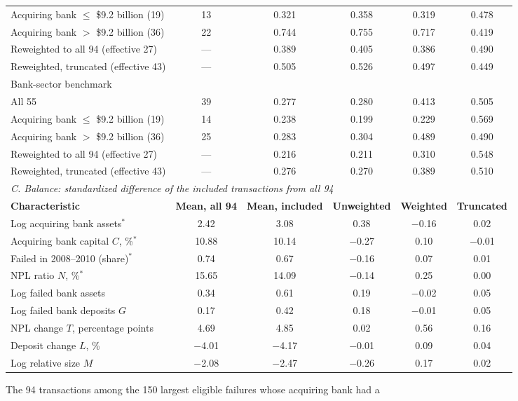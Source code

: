 \begin{table}[!t]
\begin{tabular*}{\textwidth}{@{\extracolsep{\fill}}lccccc}
\quad Acquiring bank $\leq$ \$9.2 billion (19) & 13 & 0.321 & 0.358 & 0.319 & 0.478 \\
\quad Acquiring bank $>$ \$9.2 billion (36) & 22 & 0.744 & 0.755 & 0.717 & 0.419 \\
\quad Reweighted to all 94 (effective 27) & --- & 0.389 & 0.405 & 0.386 & 0.490 \\
\quad Reweighted, truncated (effective 43) & --- & 0.505 & 0.526 & 0.497 & 0.449 \\
\multicolumn{6}{l}{Bank-sector benchmark} \\
\quad All 55 & 39 & 0.277 & 0.280 & 0.413 & 0.505 \\
\quad Acquiring bank $\leq$ \$9.2 billion (19) & 14 & 0.238 & 0.199 & 0.229 & 0.569 \\
\quad Acquiring bank $>$ \$9.2 billion (36) & 25 & 0.283 & 0.304 & 0.489 & 0.490 \\
\quad Reweighted to all 94 (effective 27) & --- & 0.216 & 0.211 & 0.310 & 0.548 \\
\quad Reweighted, truncated (effective 43) & --- & 0.276 & 0.270 & 0.389 & 0.510 \\
\midrule
\multicolumn{6}{l}{\textit{C. Balance: standardized difference of the included transactions from all 94}} \\
\textbf{Characteristic} & \textbf{Mean, all 94} & \textbf{Mean, included} & \textbf{Unweighted} & \textbf{Weighted} & \textbf{Truncated} \\
\midrule
Log acquiring bank assets$^{*}$ & 2.42 & 3.08 & 0.38 & $-$0.16 & 0.02 \\
Acquiring bank capital $C$, \%$^{*}$ & 10.88 & 10.14 & $-$0.27 & 0.10 & $-$0.01 \\
Failed in 2008--2010 (share)$^{*}$ & 0.74 & 0.67 & $-$0.16 & 0.07 & 0.01 \\
NPL ratio $N$, \%$^{*}$ & 15.65 & 14.09 & $-$0.14 & 0.25 & 0.00 \\
Log failed bank assets & 0.34 & 0.61 & 0.19 & $-$0.02 & 0.05 \\
Log failed bank deposits $G$ & 0.17 & 0.42 & 0.18 & $-$0.01 & 0.05 \\
NPL change $T$, percentage points & 4.69 & 4.85 & 0.02 & 0.56 & 0.16 \\
Deposit change $L$, \% & $-$4.01 & $-$4.17 & $-$0.01 & 0.09 & 0.04 \\
Log relative size $M$ & $-$2.08 & $-$2.47 & $-$0.26 & 0.17 & 0.02 \\
\bottomrule
\end{tabular*}
\par\vspace{2pt}\parbox{0.96\textwidth}{\scriptsize The 94 transactions among the 150 largest eligible failures whose acquiring bank had a
}
\end{table}
